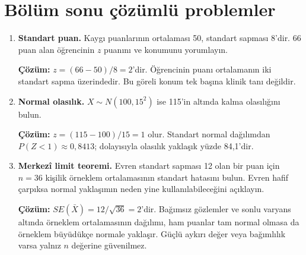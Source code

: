 \section{Bölüm sonu çözümlü problemler}

\begin{enumerate}
  \item \textbf{Standart puan.} Kaygı puanlarının ortalaması 50, standart sapması 8'dir. 66 puan alan öğrencinin $z$ puanını ve konumunu yorumlayın.

  \textbf{Çözüm:} $z=(66-50)/8=2$'dir. Öğrencinin puanı ortalamanın iki standart sapma üzerindedir. Bu göreli konum tek başına klinik tanı değildir.

  \item \textbf{Normal olasılık.} $X\sim N(100,15^2)$ ise 115'in altında kalma olasılığını bulun.

  \textbf{Çözüm:} $z=(115-100)/15=1$ olur. Standart normal dağılımdan $P(Z<1)\approx0{,}8413$; dolayısıyla olasılık yaklaşık yüzde 84,1'dir.

  \item \textbf{Merkezî limit teoremi.} Evren standart sapması 12 olan bir puan için $n=36$ kişilik örneklem ortalamasının standart hatasını bulun. Evren hafif çarpıksa normal yaklaşımın neden yine kullanılabileceğini açıklayın.

  \textbf{Çözüm:} $SE(\bar X)=12/\sqrt{36}=2$'dir. Bağımsız gözlemler ve sonlu varyans altında örneklem ortalamasının dağılımı, ham puanlar tam normal olmasa da örneklem büyüdükçe normale yaklaşır. Güçlü aykırı değer veya bağımlılık varsa yalnız $n$ değerine güvenilmez.
\end{enumerate}
